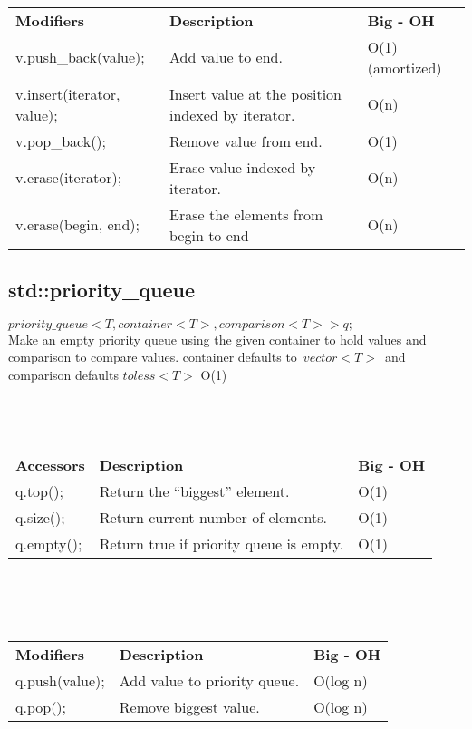 \documentclass[12pt]{article}
\begin{document}
\\
\begin{tabular}{ l l l }
\textbf{Modifiers} & \textbf{Description} & \textbf{Big - OH}\\
v.push\_back(value); & Add value to end. & O(1) (amortized)\\
v.insert(iterator, value); & Insert value at the position indexed by iterator. & O(n)\\
v.pop\_back(); & Remove value from end. & O(1)\\
v.erase(iterator); & Erase value indexed by iterator. & O(n)\\
v.erase(begin, end); & Erase the elements from begin to end & O(n)\\
\end{tabular}
\clearpage
\subsection{std::priority\_queue}

$priority\_queue<T,  container<T>,  comparison<T> > q;$\\
 Make an empty priority queue using the given container to hold values and 
 comparison to compare values. container defaults to $vector<T>$ and comparison defaults $toless<T>$ O(1)\\
\\
\\
\\
\begin{tabular}{ l l l }
\textbf{Accessors} & \textbf{Description} & \textbf{Big - OH}\\
q.top(); & Return the ``biggest'' element. & O(1)\\
q.size(); & Return current number of elements. & O(1)\\
q.empty(); & Return true if priority queue is empty. & O(1)
\end{tabular}
\\
\\
\\
\begin{tabular}{ l l l }
\textbf{Modifiers} & \textbf{Description} & \textbf{Big - OH}\\
q.push(value); & Add value to priority queue. & O(log n)\\
q.pop(); & Remove biggest value. & O(log n)\\
\end{tabular}
\clearpage
\end{document}
